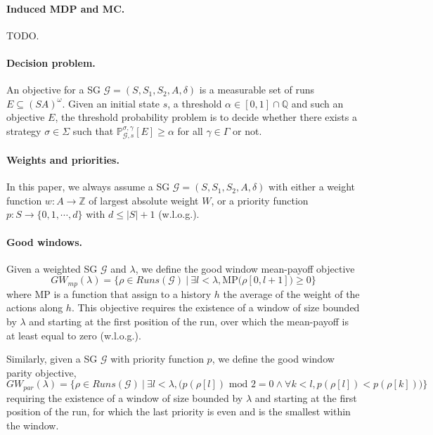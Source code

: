 \documentclass{article}
\newcommand{\IQ}{\mathbb{Q}}
\newcommand{\IZ}{\mathbb{Z}}
\newcommand{\IP}{\mathbb{P}}
\newcommand{\CG}{\mathcal{G}}
\newcommand{\SG}{(S, S_1, S_2, A, \delta)}
\theoremstyle{plain}
\begin{document}
\paragraph{Induced MDP and MC.} TODO. %

\paragraph{Decision problem.} An objective for a SG $\CG = \SG$ is a measurable set of runs $E \subseteq (SA)^{\omega}$. Given an initial state $s$, a threshold $\alpha \in [0, 1] \cap \IQ$ and such an objective $E$, the threshold probability problem is to decide whether there exists a strategy $\sigma \in \Sigma$ such that $\IP^{\sigma, \gamma}_{\CG, s} [E] \geqslant \alpha$ for all $\gamma \in \Gamma$ or not.

\paragraph{Weights and priorities.} In this paper, we always assume a SG $\CG = \SG$ with either a weight function $w: A \rightarrow \IZ$ of largest absolute weight $W$, or a priority function $p: S \rightarrow \{0, 1, \cdots, d\}$ with $d \leqslant |S|+1$ (w.l.o.g.).

\paragraph{Good windows.} Given a weighted SG $\CG$ and $\lambda$, we define the good window mean-payoff objective
$$GW_{mp}(\lambda) = \Big\{ \rho \in Runs(\CG) ~|~ \exists l < \lambda, \text{MP} \big( \rho [0, l+1] \big) \geqslant 0 \Big\}$$
where $\text{MP}$ is a function that assign to a history $h$ the average of the weight of the actions along $h$.
This objective requires the existence of a window of size bounded by $\lambda$ and starting at the first position of the run, over which the mean-payoff is at least equal to zero (w.l.o.g.).

Similarly, given a SG $\CG$ with priority function $p$, we define the good window parity objective,
$$GW_{par}(\lambda) = \Big\{ \rho \in Runs(\CG) ~|~ \exists l < \lambda, \big( p(\rho [l]) \text{ mod } 2 = 0 \wedge \forall k < l, p(\rho [l]) < p( \rho [k]) \big) \Big\}$$
requiring the existence of a window of size bounded by $\lambda$ and starting at the first position of the run, for which the last priority is even and is the smallest within the window.
\end{document}
